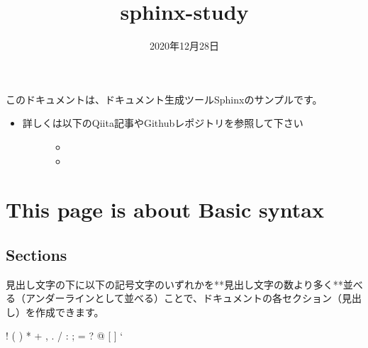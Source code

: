 \documentclass[letterpaper,10pt,dvipdfmx,openany,oneside]{sphinxmanual}
\title{sphinx-study}
\date{2020年12月28日}
\author{}
\begin{document}
\maketitle
\sphinxtableofcontents
{}\label{\detokenize{index::doc}}


このドキュメントは、ドキュメント生成ツールSphinxのサンプルです。
\begin{itemize}
\item {} \begin{description}
\item[{詳しくは以下のQiita記事やGithubレポジトリを参照して下さい}] \leavevmode\begin{itemize}
\item {} 

\item {} 

\end{itemize}

\end{description}

\end{itemize}


\chapter{This page is about Basic syntax}
\label{\detokenize{1.chapter/basic_syntax::doc}}\label{\detokenize{1.chapter/basic_syntax:sphinx-sample-project}}\label{\detokenize{1.chapter/basic_syntax:this-page-is-about-basic-syntax}}

\section{Sections}
\label{\detokenize{1.chapter/basic_syntax:sections}}
見出し文字の下に以下の記号文字のいずれかを**見出し文字の数より多く**並べる（アンダーラインとして並べる）ことで、ドキュメントの各セクション（見出し）を作成できます。

%
\begin{sphinxVerbatim}[commandchars=\\\{\}]
! \PYGZdq{} \PYGZsh{} \PYGZdl{} \PYGZpc{} \PYGZam{} \PYGZsq{} ( ) * + , \PYGZhy{} . / : ; \PYGZlt{} = \PYGZgt{} ? @ [ \PYGZbs{} ] \PYGZca{} \PYGZus{} {}` \PYGZob{} \textbar{} \PYGZcb{} \PYGZti{}
\end{sphinxVerbatim}
\end{document}
